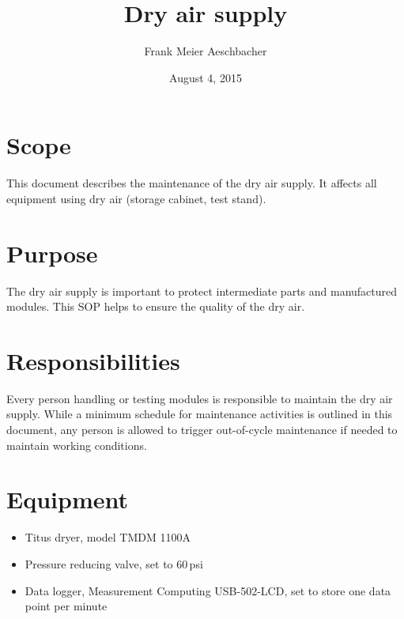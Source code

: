 \documentclass[12pt]{unlsilabsop}
\title{Dry air supply}
\date{August 4, 2015}
\author{Frank Meier Aeschbacher}
\begin{document}
\maketitle

\section{Scope}
This document describes the maintenance of the dry air supply. It affects all equipment using dry air (storage cabinet, test stand).

\section{Purpose}
The dry air supply is important to protect intermediate parts and manufactured modules. This SOP helps to ensure the quality of the dry air.


\section{Responsibilities}
Every person handling or testing modules is responsible to maintain the dry air supply. While a minimum schedule for maintenance activities is outlined in this document, any person is allowed to trigger out-of-cycle maintenance if needed to maintain working conditions.

\section{Equipment}

\begin{itemize}
    \item Titus dryer, model TMDM 1100A
    \item Pressure reducing valve, set to 60\,psi
    \item Data logger, Measurement Computing USB-502-LCD, set to store one data point per minute
\end{itemize}
\end{document}
